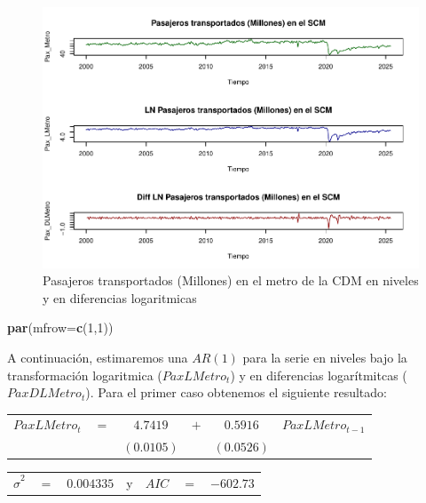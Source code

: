 \documentclass[
]{book}
\newenvironment{Shaded}{\begin{snugshade}}{\end{snugshade}}
\newcommand{\AttributeTok}[1]{\textcolor[rgb]{0.13,0.29,0.53}{#1}}
\newcommand{\DecValTok}[1]{\textcolor[rgb]{0.00,0.00,0.81}{#1}}
\newcommand{\FunctionTok}[1]{\textcolor[rgb]{0.13,0.29,0.53}{\textbf{#1}}}
\newcommand{\NormalTok}[1]{#1}
\begin{document}
\begin{figure}

{\centering \includegraphics{Notas-Series-Tiempo_files/figure-latex/fig46-1} 

}

\caption{Pasajeros transportados (Millones) en el metro de la CDM en niveles y en diferencias logaritmicas}\label{fig:fig46}
\end{figure}

\begin{Shaded}
\begin{Highlighting}[]
\FunctionTok{par}\NormalTok{(}\AttributeTok{mfrow=}\FunctionTok{c}\NormalTok{(}\DecValTok{1}\NormalTok{,}\DecValTok{1}\NormalTok{))}
\end{Highlighting}
\end{Shaded}

A continuación, estimaremos una \(AR(1)\) para la serie en niveles bajo la transformación logaritmica (\(PaxLMetro_t\)) y en diferencias
logarítmitcas (\(PaxDLMetro_t\)). Para el primer caso obtenemos el siguiente resultado:

\begin{center}
\begin{tabular}{ c c c c c c } 
    $PaxLMetro_t$ & $=$ & $4.7419$ & $+$ & $0.5916$  & $PaxLMetro_{t-1}$ \\ 
    &  & $(0.0105)$ &  & $(0.0526)$ & 
\end{tabular}
\end{center}

\begin{center}
\begin{tabular}{ c c c c c c c } 
    $\hat{\sigma}^2$ & $=$ & $0.004335$ & y & $AIC$ & $=$ & $-602.73$ 
\end{tabular}
\end{center}
\end{document}

